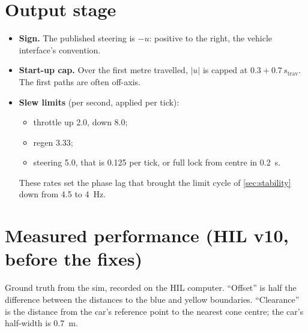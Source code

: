 \documentclass[11pt,a4paper]{article}
\begin{document}
\section{Output stage}
\begin{itemize}
\item \textbf{Sign.} The published steering is $-u$: positive to the right, the vehicle
interface's convention.
\item \textbf{Start-up cap.} Over the first metre travelled, $|u|$ is capped at
$0.3 + 0.7\,s_{\text{trav}}$. The first paths are often off-axis.
\item \textbf{Slew limits} (per second, applied per tick):
\begin{itemize}
\item throttle up 2.0, down 8.0;
\item regen 3.33;
\item steering 5.0, that is \num{0.125} per tick, or full lock from centre in
\SI{0.2}{\second}.
\end{itemize}
These rates set the phase lag that brought the limit cycle of \cref{sec:stability} down
from \SI{4.5}{} to \SI{4}{\hertz}.
\end{itemize}

\section{Measured performance (HIL v10, before the fixes)}
Ground truth from the sim, recorded on the HIL computer. ``Offset'' is half the
difference between the distances to the blue and yellow boundaries. ``Clearance'' is the
distance from the car's reference point to the nearest cone centre; the car's half-width
is \SI{0.7}{\metre}.
\end{document}
